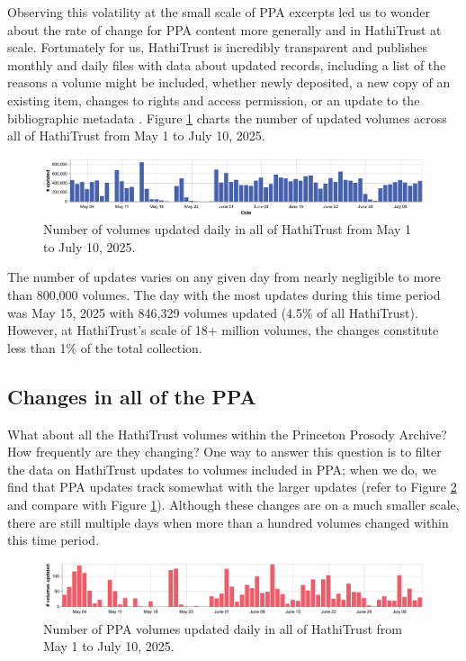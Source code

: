 \documentclass{anthology-ch}         %
\begin{document}
Observing this volatility at the small scale of PPA excerpts led us to wonder about the rate of change for  PPA content more generally and in HathiTrust at scale. Fortunately for us, HathiTrust is incredibly transparent and publishes monthly and daily files with data about updated records, including a list of the reasons a volume might be included, whether newly deposited, a new copy of an existing item, changes to rights and access permission, or an update to the bibliographic metadata \cite{noauthor_hathifiles_nodate} .  Figure \ref{fig:hathi-daily-updates} charts the number of updated volumes across all of HathiTrust from May 1 to July 10, 2025.
\begin{figure}[t!]
    \centering
    \includegraphics[width=1\linewidth]{figures/hathitrust_changes_countonly.pdf}
    \caption{Number of volumes updated daily in all of HathiTrust from May 1 to July 10, 2025.}
    \label{fig:hathi-daily-updates}
\end{figure}
The number of updates varies on any given day from nearly negligible to more than 800,000 volumes. The day with the most updates during this time period was May 15, 2025 with 846,329 volumes updated (4.5\% of all HathiTrust).  However, at HathiTrust’s scale of 18+ million volumes, the changes constitute less than 1\% of the total collection. 

\subsection{Changes in all of the PPA}

What about all the HathiTrust volumes within the Princeton Prosody Archive? How frequently are they changing? One way to answer this question is to filter the data on HathiTrust updates to volumes included in PPA; when we do, we find that PPA updates track somewhat with the larger updates (refer to Figure \ref{fig:ppa-daily-updates} and compare with Figure \ref{fig:hathi-daily-updates}). Although these changes are on a much smaller scale, there are still multiple days when more than a hundred volumes changed within this time period.

\begin{figure}[t!]
    \centering
    \includegraphics[width=1\linewidth]{figures/ppa_hathitrust_changes_countonly.pdf}
    \caption{Number of PPA volumes updated daily in all of HathiTrust from May 1 to July 10, 2025.}
    \label{fig:ppa-daily-updates}
\end{figure}
\end{document}
